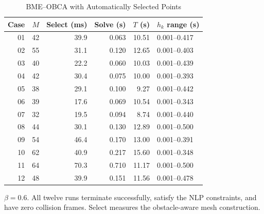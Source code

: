 \begin{table}[t]
\caption{BME--OBCA with Automatically Selected Points}\label{tab:cases}
\centering\footnotesize
\begin{tabular}{@{}rrrrrl@{}}\toprule
Case&$M$&Select (ms)&Solve (s)&$T$ (s)&$h_k$ range (s)\\\midrule
01&42&39.9&0.063&10.51&0.001--0.417\\
02&55&31.1&0.120&12.65&0.001--0.403\\
03&40&22.2&0.060&10.03&0.001--0.439\\
04&42&30.4&0.075&10.00&0.001--0.393\\
05&38&29.1&0.100&9.27&0.001--0.442\\
06&39&17.6&0.069&10.54&0.001--0.343\\
07&32&19.5&0.094&8.74&0.001--0.440\\
08&44&30.1&0.130&12.89&0.001--0.500\\
09&54&46.4&0.170&13.00&0.001--0.391\\
10&62&40.9&0.217&15.60&0.001--0.348\\
11&64&70.3&0.710&11.17&0.001--0.500\\
12&48&39.9&0.151&11.56&0.001--0.478\\
\bottomrule\end{tabular}
\par\par\smallskip\parbox{\columnwidth}{\footnotesize $\beta=0.6$. All twelve runs terminate successfully, satisfy the NLP constraints, and have zero collision frames. Select measures the obstacle-aware mesh construction.}
\end{table}